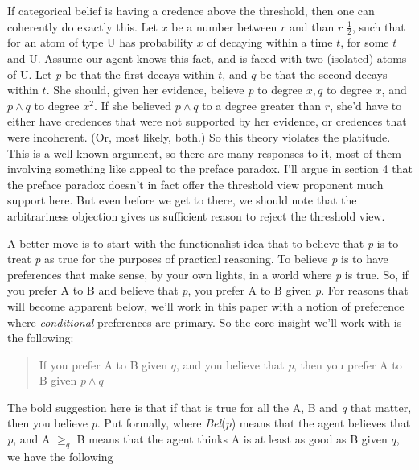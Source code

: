\documentclass[
  11pt,
  letterpaper,
  DIV=11,
  numbers=noendperiod,
  oneside]{scrartcl}
\begin{document}
If categorical belief is having a credence above the threshold, then one
can coherently do exactly this. Let \(x\) be a number between \(r\) and
than \(r\) \(\frac{1}{2}\), such that for an atom of type U has
probability \(x\) of decaying within a time \(t\), for some \(t\) and U.
Assume our agent knows this fact, and is faced with two (isolated) atoms
of U. Let \emph{p} be that the first decays within \(t\), and \(q\) be
that the second decays within \(t\). She should, given her evidence,
believe \emph{p} to degree \(x, q\) to degree \(x\), and \(p \wedge q\)
to degree \(x ^2\). If she believed \(p \wedge q\) to a degree greater
than \(r\), she'd have to either have credences that were not supported
by her evidence, or credences that were incoherent. (Or, most likely,
both.) So this theory violates the platitude. This is a well-known
argument, so there are many responses to it, most of them involving
something like appeal to the preface paradox. I'll argue in section 4
that the preface paradox doesn't in fact offer the threshold view
proponent much support here. But even before we get to there, we should
note that the arbitrariness objection gives us sufficient reason to
reject the threshold view.

A better move is to start with the functionalist idea that to believe
that \emph{p} is to treat \emph{p} as true for the purposes of practical
reasoning. To believe \emph{p} is to have preferences that make sense,
by your own lights, in a world where \emph{p} is true. So, if you prefer
A to B and believe that \emph{p}, you prefer A to B given \emph{p}. For
reasons that will become apparent below, we'll work in this paper with a
notion of preference where \emph{conditional} preferences are
primary. So the core insight we'll work with is the following:

\begin{quote}
If you prefer A to B given \(q\), and you believe that \emph{p}, then
you prefer A to B given \(p \wedge q\)
\end{quote}

The bold suggestion here is that if that is true for all the A, B and
\emph{q} that matter, then you believe \emph{p}. Put formally, where
\emph{Bel}(\emph{p}) means that the agent believes that \emph{p}, and A
\(\geq _q\) B means that the agent thinks A is at least as good as B
given \(q\), we have the following
\end{document}
